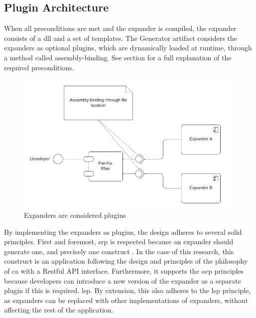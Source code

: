 \subsection{Plugin Architecture} \label{subsec_plugin_architecture}

When all preconditions are met and the expander is compiled, the expander consists of a
\gls{dll} and a set of templates. The Generator artifact considers the expanders as
optional plugins, which are dynamically loaded at runtime, through a method called
assembly-binding. See section  for a full explanation of the
required preconditions.

\begin{figure}[H]
  \centering
  \includegraphics[width=1\textwidth]{Figures/plugin_architecture.pdf}
  \caption[Plugin Archticture]{Expanders are considered plugins}
  \label{fi:plugin_architecture}
\end{figure}

By implementing the expanders as plugins, the design adheres to several \gls{solid}
principles. First and foremost, \gls{srp} is respected because an expander should generate
one, and precisely one construct \parencite[403]{mannaert_normalized_2016}. In the case of
this research, this construct is an application following the design and principles of the
philosophy of \gls{ca} with a Restful API interface. Furthermore, it supports the
\gls{ocp} principles because developers can introduce a new version of the expander as a
separate plugin if this is required. \gls{lsp}. By extension, this also adheres to the
\gls{lsp} principle, as expanders can be replaced with other implementations of expanders,
without affecting the rest of the application.